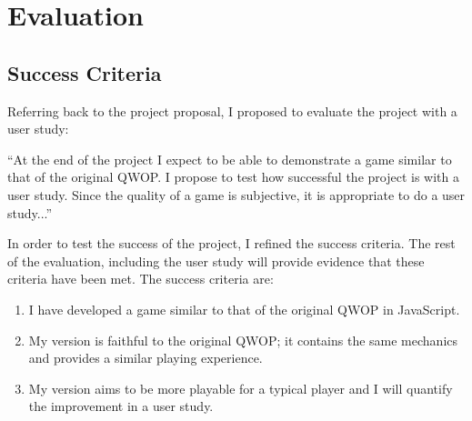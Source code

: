 \documentclass[12pt,a4paper,twoside,openright]{report}
\begin{document}

\chapter{Evaluation}
\section{Success Criteria}

Referring back to the project proposal,
I proposed to evaluate the project with a user study:

\begin{displayquote}
``At the end of the project I expect to be able to demonstrate a game similar to that of the original QWOP.
I propose to test how successful the project is with a user study. Since the quality of a game is subjective, it is appropriate to do a user study...''
\end{displayquote}

In order to test the success of the project, I refined the success criteria.
The rest of the evaluation, including the user study will provide evidence that these criteria have been met.
The success criteria are:

\begin{enumerate} 
	\item I have developed a game similar to that of the original QWOP in JavaScript.
	\item My version is faithful to the original QWOP; it contains the same mechanics 
    and provides a similar playing experience.
    \item My version aims to be more playable for a typical player and I will quantify the improvement in a user study.
\end{enumerate}
\end{document}
